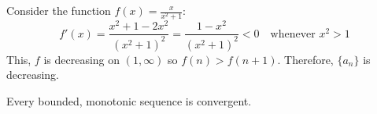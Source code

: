   \begin{solution}[2]
    Consider the function $f(x)=\frac{x}{x^2+1}$:
    $$f'(x)=\frac{x^2+1-2x^2}{(x^2+1)^2} = \frac{1-x^2}{(x^2+1)^2} < 0 \quad \text{whenever } x^2>1$$
    This, $f$ is decreasing on $(1,\infty)$ so $f(n)>f(n+1)$. Therefore, $\{a_n\}$ is decreasing.
  \end{solution}
  \begin{theorem}
    Every bounded, monotonic sequence is convergent.
  \end{theorem}